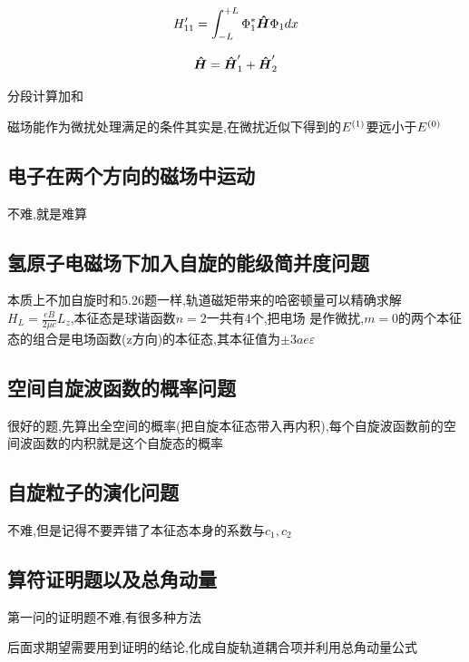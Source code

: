             $$
            H'_{11} = \int_{-L}^{+L} \Phi_{1}^{*} \vu*{H} \Phi_{1} dx 
            $$

            $$ \vu*{H} = \vu*{H}'_{1} + \vu*{H}'_{2} $$

            分段计算加和

            磁场能作为微扰处理满足的条件其实是,在微扰近似下得到的$E_{}^{(1)}$要远小于$E_{}^{(0)}$

        \subsection{电子在两个方向的磁场中运动}
            不难,就是难算

        \subsection{氢原子电磁场下加入自旋的能级简并度问题}
            本质上不加自旋时和5.26题一样,轨道磁矩带来的哈密顿量可以精确求解$H_{L} = \frac{eB}{2\mu c} L_{z}$,本征态是球谐函数$n=2$一共有4个,把电场
            是作微扰,$m=0$的两个本征态的组合是电场函数(z方向)的本征态,其本征值为$\pm 3 a e \varepsilon$

        \subsection{空间自旋波函数的概率问题}
            很好的题,先算出全空间的概率(把自旋本征态带入再内积),每个自旋波函数前的空间波函数的内积就是这个自旋态的概率

        \subsection{自旋粒子的演化问题}
            不难,但是记得不要弄错了本征态本身的系数与$c_{1},c_{2}$

        \subsection{算符证明题以及总角动量}
            第一问的证明题不难,有很多种方法

            后面求期望需要用到证明的结论,化成自旋轨道耦合项并利用总角动量公式
            
